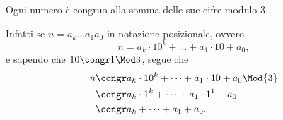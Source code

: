 \begin{example}
    Ogni numero è congruo alla somma delle sue cifre modulo $3$.

    Infatti se $n = a_k \dots a_1a_0$ in notazione posizionale, ovvero \[
        n = a_k\cdot 10^k + \dots + a_1\cdot 10 + a_0,   
    \] e sapendo che $10 \congr 1 \Mod 3$, segue che \begin{align*}
        n &\congr a_k\cdot 10^k + \dots + a_1\cdot 10 + a_0 \Mod{3}\\
        &\congr a_k \cdot 1^k + \dots + a_1 \cdot 1^1 + a_0\\
        &\congr a_k + \dots + a_1 + a_0.
    \end{align*}
\end{example}

